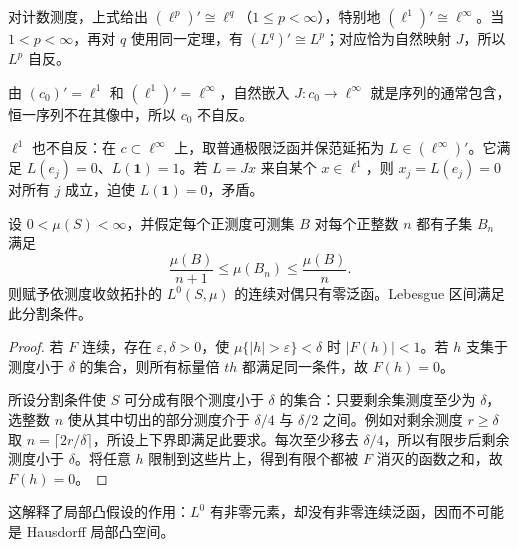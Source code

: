 对计数测度，上式给出 $(\ell^p)'\cong\ell^q$（$1\le p<\infty$），特别地 $(\ell^1)'\cong\ell^\infty$。当 $1<p<\infty$，再对 $q$ 使用同一定理，有 $(L^q)'\cong L^p$；对应恰为自然映射 $J$，所以 $L^p$ 自反。

\begin{example}[完备不蕴含自反]\label{ex:y4-nonreflexive}
由 $(c_0)'=\ell^1$ 和 $(\ell^1)'=\ell^\infty$，自然嵌入 $J:c_0\to\ell^\infty$ 就是序列的通常包含，恒一序列不在其像中，所以 $c_0$ 不自反。

$\ell^1$ 也不自反：在 $c\subset\ell^\infty$ 上，取普通极限泛函并保范延拓为 $L\in(\ell^\infty)'$。它满足 $L(e_j)=0$、$L(\mathbf1)=1$。若 $L=Jx$ 来自某个 $x\in\ell^1$，则 $x_j=L(e_j)=0$ 对所有 $j$ 成立，迫使 $L(\mathbf1)=0$，矛盾。
\end{example}

\begin{proposition}[非局部凸空间可能没有非零连续泛函]\label{prop:y4-L0-trivial-dual}
设 $0<\mu(S)<\infty$，并假定每个正测度可测集 $B$ 对每个正整数 $n$ 都有子集 $B_n$ 满足
\[
 \frac{\mu(B)}{n+1}\le\mu(B_n)\le\frac{\mu(B)}n.
\]
则赋予依测度收敛拓扑的 $L^0(S,\mu)$ 的连续对偶只有零泛函。Lebesgue 区间满足此分割条件。
\end{proposition}
\begin{proof}
若 $F$ 连续，存在 $\varepsilon,\delta>0$，使
$\mu\{|h|>\varepsilon\}<\delta$ 时 $|F(h)|<1$。若 $h$ 支集于测度小于 $\delta$ 的集合，则所有标量倍 $th$ 都满足同一条件，故 $F(h)=0$。

所设分割条件使 $S$ 可分成有限个测度小于 $\delta$ 的集合：只要剩余集测度至少为 $\delta$，选整数 $n$ 使从其中切出的部分测度介于 $\delta/4$ 与 $\delta/2$ 之间。例如对剩余测度 $r\ge\delta$ 取 $n=\lceil2r/\delta\rceil$，所设上下界即满足此要求。每次至少移去 $\delta/4$，所以有限步后剩余测度小于 $\delta$。将任意 $h$ 限制到这些片上，得到有限个都被 $F$ 消灭的函数之和，故 $F(h)=0$。
\end{proof}

这解释了局部凸假设的作用：$L^0$ 有非零元素，却没有非零连续泛函，因而不可能是 Hausdorff 局部凸空间。

